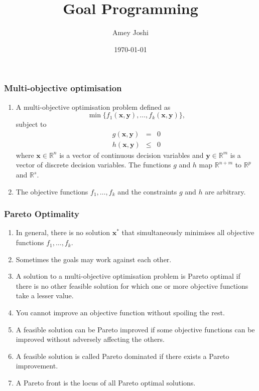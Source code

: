 \documentclass{beamer}
\title{Goal Programming}
\author{Amey Joshi}
\date{\today}
\begin{document}
\begin{frame}
\titlepage
\end{frame}

\begin{frame}
\frametitle{Multi-objective optimisation}
\begin{enumerate}
\item A multi-objective optimisation problem defined as 
\begin{equation}\label{e1}
\min\{f_1(\bm{x}, \bm{y}), \ldots, f_k(\bm{x}, \bm{y})\},
\end{equation}
subject to
\begin{eqnarray}
g(\bm{x}, \bm{y}) &=& 0 \label{e2} \\
h(\bm{x}, \bm{y}) &\le& 0 \label{e3}
\end{eqnarray}
where $\bm{x} \in \mathbb{R}^n$ is a vector of continuous decision variables and
$\bm{y} \in \mathbb{R}^m$ is a vector of discrete decision variables. The functions
$g$ and $h$ map $\mathbb{R}^{n+m}$ to $\mathbb{R}^p$ and $\mathbb{R}^s$.
\item The objective functions $f_1, \ldots, f_k$ and the constraints $g$ and 
$h$ are arbitrary.
\end{enumerate}
\end{frame}

\begin{frame}
\frametitle{Pareto Optimality}
\begin{enumerate}
\item In general, there is no solution $\bm{x}^\ast$ that simultaneously 
minimises all objective functions $f_1, \ldots, f_k$.
\item Sometimes the goals may work against each other.
\item A solution to a multi-objective optimisation problem is Pareto optimal if
there is no other feasible solution for which one or more objective functions 
take a lesser value.
\item You cannot improve an objective function without spoiling the rest.
\item A feasible solution can be Pareto improved if some objective functions can
be improved without adversely affecting the others.
\item A feasible solution is called Pareto dominated if there exists a Pareto
improvement.
\item A Pareto front is the locus of all Pareto optimal solutions.
\end{enumerate}
\end{frame}
\end{document}
